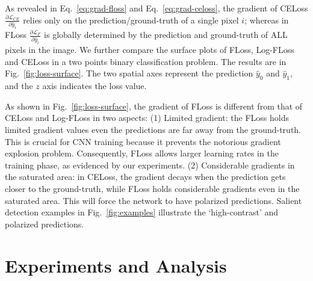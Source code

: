 \documentclass[10pt,twocolumn,letterpaper]{article}
\begin{document}
As revealed in Eq.~\ref{eq:grad-floss} and Eq.~\ref{eq:grad-celoss}, the gradient of CELoss
$\frac{\partial \mathcal{L}_{CE}}{\partial \hat{y}_i}$ relies only on the
prediction/ground-truth of a single pixel $i$;
whereas in FLoss $\frac{\partial \mathcal{L}_{F}}{\partial \hat{y}_i}$
is globally determined by
the prediction and ground-truth of ALL pixels in the image.
%
We further compare the surface plots
of FLoss, Log-FLoss and CELoss in a two points binary classification problem.
%
The results are in Fig.~\ref{fig:loss-surface}.
%
The two spatial axes represent the prediction $\hat{y}_0$ and $\hat{y}_1$,
and the $z$ axis indicates the loss value.

As shown in Fig.~\ref{fig:loss-surface},
the gradient of FLoss is different from that of CELoss and Log-FLoss in two aspects:
(1) Limited gradient: the FLoss holds limited gradient values even
the predictions are far away from the ground-truth.
%
This is crucial for CNN training because it prevents the notorious gradient explosion problem.
Consequently, FLoss allows larger learning rates in the training phase, as evidenced by
our experiments.
%
(2) Considerable gradients in the saturated area: in CELoss, the gradient decays
when the prediction gets closer to the ground-truth,
while FLoss holds considerable gradients even in the saturated area.
%
This will force the network to have polarized predictions.
%
Salient detection examples in Fig.~\ref{fig:examples} illustrate the `high-contrast'
and polarized predictions.

\section{Experiments and Analysis}

\end{document}
